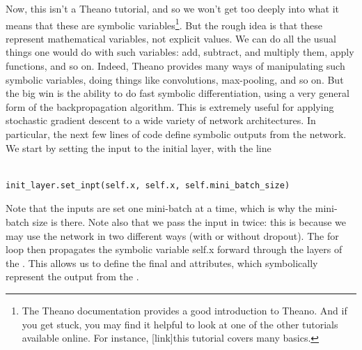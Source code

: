\documentclass[a4paper,twoside,10pt]{book}
\begin{document}
Now, this isn't a Theano tutorial, and so we won't get too deeply into what it means that these are symbolic variables\footnote{The Theano documentation provides a good introduction to Theano. And if you get stuck, you may find it helpful to look at one of the other tutorials available online. For instance, [link]this tutorial covers many basics.}. But the rough idea is that these represent mathematical variables, not explicit values. We can do all the usual things one would do with such variables: add, subtract, and multiply them, apply functions, and so on. Indeed, Theano provides many ways of manipulating such symbolic variables, doing things like convolutions, max-pooling, and so on. But the big win is the ability to do fast symbolic differentiation, using a very general form of the backpropagation algorithm. This is extremely useful for applying stochastic gradient descent to a wide variety of network architectures. In particular, the next few lines of code define symbolic outputs from the network. We start by setting the input to the initial layer, with the line
\begin{lstlisting}

init_layer.set_inpt(self.x, self.x, self.mini_batch_size)

\end{lstlisting}
Note that the inputs are set one mini-batch at a time, which is why the mini-batch size is there. Note also that we pass the input  in twice: this is because we may use the network in two different ways (with or without dropout). The for loop then propagates the symbolic variable self.x forward through the layers of the . This allows us to define the final  and  attributes, which symbolically represent the output from the .
\end{document}
